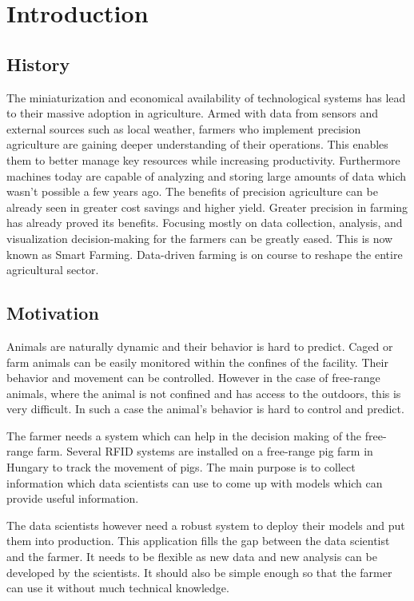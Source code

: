 \chapter{Introduction}
\label{ch:introduction}

\section{History}

The miniaturization and economical availability of technological systems has
lead to their massive adoption in agriculture. Armed with data from sensors and
external sources such as local weather, farmers who implement precision
agriculture are gaining deeper understanding of their operations. This enables
them to better manage key resources while increasing productivity. Furthermore
machines today are capable of analyzing and storing large amounts of data which
wasn't possible a few years ago. The benefits of precision agriculture can be
already seen in greater cost savings and higher yield. Greater precision in
farming has already proved its benefits. Focusing mostly on data collection,
analysis, and visualization decision-making for the farmers can be greatly
eased. This is now known as Smart Farming. Data-driven farming is on course to
reshape the entire agricultural sector.

\section{Motivation}

Animals are naturally dynamic and their behavior is hard to predict. Caged or
farm animals can be easily monitored within the confines of the facility. Their
behavior and movement can be controlled. However in the case of free-range
animals, where the animal is not confined and has access to the outdoors, this
is very difficult. In such a case the animal's behavior is hard to control and
predict.

The farmer needs a system which can help in the decision making of the
free-range farm. Several RFID systems are installed on a free-range pig farm in
Hungary to track the movement of pigs. The main purpose is to collect
information which data scientists can use to come up with models which can
provide useful information. 

The data scientists however need a robust system to deploy their models and put
them into production. This application fills the gap between the data scientist
and the farmer. It needs to be flexible as new data and new analysis can be
developed by the scientists. It should also be simple enough so that the farmer
can use it without much technical knowledge.

